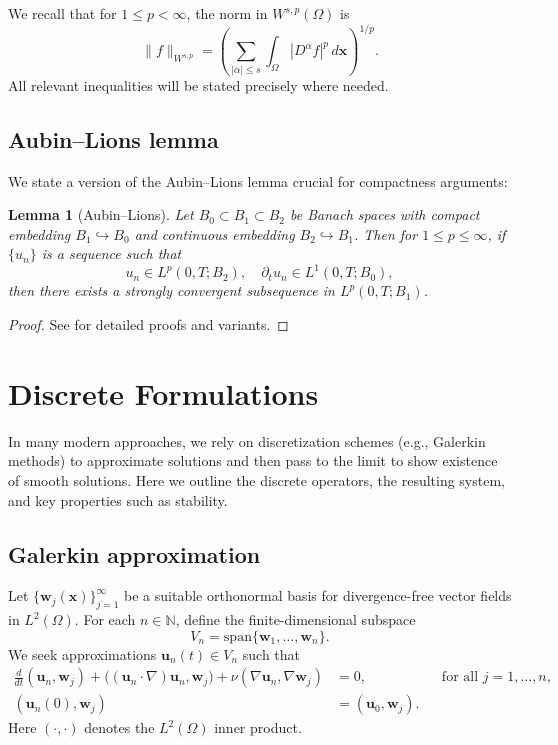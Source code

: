 \documentclass[11pt]{article}
\newtheorem{lemma}[theorem]{Lemma}
\numberwithin{equation}{section}
\begin{document}
We recall that for \(1 \leq p < \infty\), the norm in \(W^{s,p}(\Omega)\) is
\[
\| f \|_{W^{s,p}} = \left(
   \sum_{|\alpha|\le s} \int_\Omega |D^\alpha f|^p \, d\mathbf{x}
\right)^{1/p}.
\]
All relevant inequalities will be stated precisely where needed.

\subsection{Aubin--Lions lemma}

We state a version of the Aubin--Lions lemma crucial for compactness arguments:

\begin{lemma}[Aubin--Lions]
\label{lemma:aubin_lions}
Let \(B_0 \subset B_1 \subset B_2\) be Banach spaces with compact embedding
\(B_1 \hookrightarrow B_0\) and continuous embedding \(B_2 \hookrightarrow B_1\).
Then for \(1 \leq p \leq \infty\), if \(\{u_n\}\) is a sequence such that
\[
u_n \in L^p(0,T;B_2), \quad
\partial_t u_n \in L^1(0,T;B_0),
\]
then there exists a strongly convergent subsequence in \(L^p(0,T;B_1)\).
\end{lemma}

\begin{proof}
See \cite{ConstantinFoias,Temam} for detailed proofs and variants.
\end{proof}

\section{Discrete Formulations}\label{sec:discrete}

In many modern approaches, we rely on discretization schemes (e.g., Galerkin methods)
to approximate solutions and then pass to the limit to show existence of smooth
solutions. Here we outline the discrete operators, the resulting system, and
key properties such as stability.

\subsection{Galerkin approximation}

Let \(\{\mathbf{w}_j(\mathbf{x})\}_{j=1}^\infty\) be a suitable orthonormal basis
for divergence-free vector fields in \(L^2(\Omega)\).
For each \(n\in \mathbb{N}\), define the finite-dimensional subspace
\[
V_n = \mathrm{span}\{\mathbf{w}_1, \dots, \mathbf{w}_n\}.
\]
We seek approximations \(\mathbf{u}_n(t) \in V_n\) such that
\begin{equation}\label{eq:Galerk}
\begin{aligned}
\frac{d}{dt}(\mathbf{u}_n,\mathbf{w}_j)
+ \bigl((\mathbf{u}_n\cdot \nabla)\mathbf{u}_n,\mathbf{w}_j\bigr)
+ \nu(\nabla \mathbf{u}_n,\nabla \mathbf{w}_j)
&= 0,
&& \text{for all } j = 1,\ldots,n, \\
(\mathbf{u}_n(0), \mathbf{w}_j) &= (\mathbf{u}_0,\mathbf{w}_j).
\end{aligned}
\end{equation}
Here \((\cdot,\cdot)\) denotes the \(L^2(\Omega)\) inner product.
\end{document}
